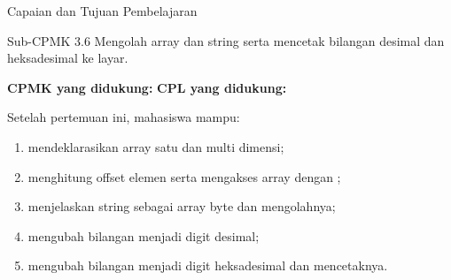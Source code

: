 \documentclass[aspectratio=169,11pt]{beamer}
\begin{document}

\begin{frame}{Capaian dan Tujuan Pembelajaran}
\begin{block}{Sub-CPMK 3.6}
\footnotesize Mengolah array dan string serta mencetak bilangan
desimal dan heksadesimal ke layar.
\end{block}

\vspace{0.1em}
{\small\textbf{CPMK yang didukung:} \quad\textbullet\quad
\textbf{CPL yang didukung:} \par}

\vspace{0.15em}
\begin{exampleblock}{Setelah pertemuan ini, mahasiswa mampu:}
\footnotesize
\begin{enumerate}
    \item mendeklarasikan array satu dan multi dimensi;
    \item menghitung offset elemen serta mengakses array dengan
          ;
    \item menjelaskan string sebagai array byte dan mengolahnya;
    \item mengubah bilangan menjadi digit desimal;
    \item mengubah bilangan menjadi digit heksadesimal dan
          mencetaknya.
\end{enumerate}
\end{exampleblock}
\end{frame}
\end{document}
